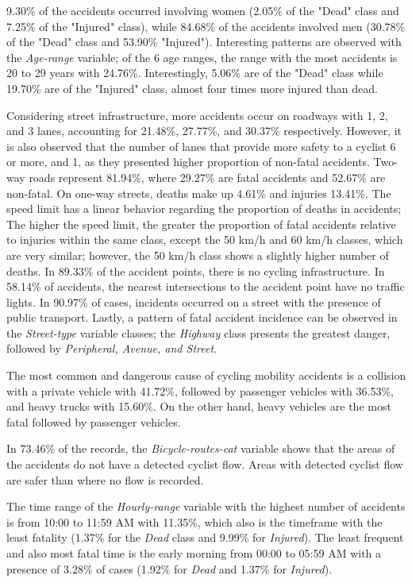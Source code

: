 \documentclass[preprint,12pt]{elsarticle}
\begin{document}
9.30\% of the accidents occurred involving women (2.05\% of the "Dead" class and 7.25\% of the "Injured" class), while 84.68\% of the accidents involved men (30.78\% of the "Dead" class and 53.90\% "Injured"). Interesting patterns are observed with the \textit{Age-range} variable; of the 6 age ranges, the range with the most accidents is 20 to 29 years with 24.76\%. Interestingly, 5.06\% are of the "Dead" class while 19.70\% are of the "Injured" class, almost four times more injured than dead.

Considering street infrastructure, more accidents occur on roadways with 1, 2, and 3 lanes, accounting for 21.48\%, 27.77\%, and 30.37\% respectively. However, it is also observed that the number of lanes that provide more safety to a cyclist 6 or more, and 1, as they presented higher proportion of non-fatal accidents. Two-way roads represent 81.94\%, where 29.27\% are fatal accidents and 52.67\% are non-fatal. On one-way streets, deaths make up 4.61\% and injuries 13.41\%. The speed limit has a linear behavior regarding the proportion of deaths in accidents; The higher the speed limit, the greater the proportion of fatal accidents relative to injuries within the same class, except the 50 km/h and 60 km/h classes, which are very similar; however, the 50 km/h class shows a slightly higher number of deaths. In 89.33\% of the accident points, there is no cycling infrastructure. In 58.14\% of accidents, the nearest intersections to the accident point have no traffic lights. In 90.97\% of cases, incidents occurred on a street with the presence of public transport. Lastly, a pattern of fatal accident incidence can be observed in the \textit{Street-type} variable classes; the \textit{Highway} class presents the greatest danger, followed by \textit{Peripheral, Avenue, and Street}.

The most common and dangerous cause of cycling mobility accidents is a collision with a private vehicle with 41.72\%, followed by passenger vehicles with 36.53\%, and heavy trucks with 15.60\%. On the other hand, heavy vehicles are the most fatal followed by passenger vehicles.

In 73.46\% of the records, the \textit{Bicycle-routes-cat} variable shows that the areas of the accidents do not have a detected cyclist flow. Areas with detected cyclist flow are safer than where no flow is recorded.

The time range of the \textit{Hourly-range} variable with the highest number of accidents is from 10:00 to 11:59 AM with 11.35\%, which also is the timeframe with the least fatality (1.37\% for the \textit{Dead} class and 9.99\% for \textit{Injured}). The least frequent and also most fatal time is the early morning from 00:00 to 05:59 AM with a presence of 3.28\% of cases (1.92\% for \textit{Dead} and 1.37\% for \textit{Injured}).
\end{document}
